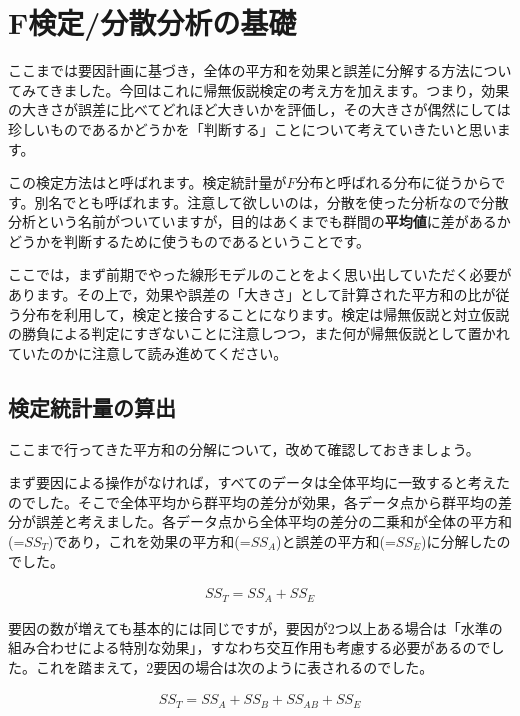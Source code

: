 \documentclass{ltjbook}
\begin{document}
\chapter{F検定/分散分析の基礎}
\label{ch19_Ftest}

ここまでは要因計画に基づき，全体の平方和を効果と誤差に分解する方法についてみてきました。今回はこれに帰無仮説検定の考え方を加えます。つまり，効果の大きさが誤差に比べてどれほど大きいかを評価し，その大きさが偶然にしては珍しいものであるかどうかを「判断する」ことについて考えていきたいと思います。

この検定方法はと呼ばれます。検定統計量が$F$分布と呼ばれる分布に従うからです。別名でとも呼ばれます。注意して欲しいのは，分散を使った分析なので分散分析という名前がついていますが，目的はあくまでも群間の\textbf{平均値}に差があるかどうかを判断するために使うものであるということです。


ここでは，まず前期でやった線形モデルのことをよく思い出していただく必要があります。その上で，効果や誤差の「大きさ」として計算された平方和の比が従う分布を利用して，検定と接合することになります。検定は帰無仮説と対立仮説の勝負による判定にすぎないことに注意しつつ，また何が帰無仮説として置かれていたのかに注意して読み進めてください。

\section{検定統計量の算出}
ここまで行ってきた平方和の分解について，改めて確認しておきましょう。

まず要因による操作がなければ，すべてのデータは全体平均に一致すると考えたのでした。そこで全体平均から群平均の差分が効果，各データ点から群平均の差分が誤差と考えました。各データ点から全体平均の差分の二乗和が全体の平方和(=$SS_T$)であり，これを効果の平方和(=$SS_A$)と誤差の平方和(=$SS_E$)に分解したのでした。

\begin{align}
SS_T = SS_A + SS_E
\end{align}

要因の数が増えても基本的には同じですが，要因が2つ以上ある場合は「水準の組み合わせによる特別な効果」，すなわち交互作用も考慮する必要があるのでした。これを踏まえて，2要因の場合は次のように表されるのでした。

\begin{align}
SS_T = SS_A + SS_B + SS_{AB} + SS_E
\end{align}
\end{document}
